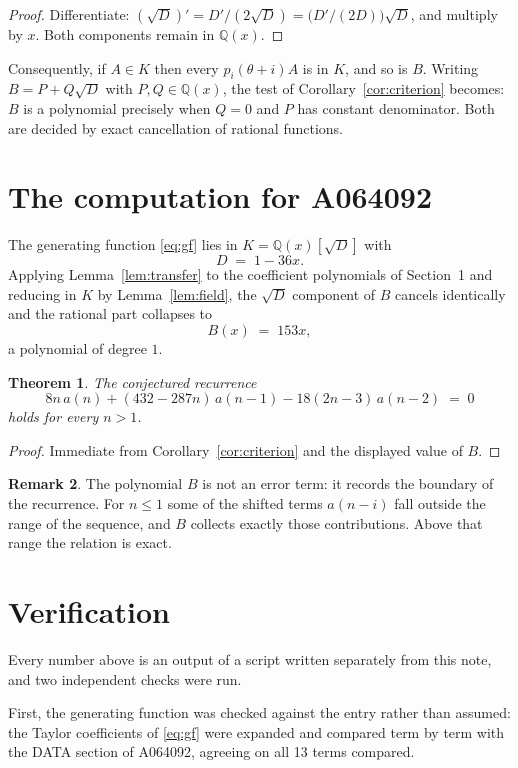 \documentclass[11pt,a4paper]{article}
\theoremstyle{plain}
\newtheorem{theorem}{Theorem}
\theoremstyle{definition}
\newtheorem{remark}[theorem]{Remark}
\begin{document}
\begin{proof}
Differentiate: $(\sqrt{D})'=D'/(2\sqrt{D})=\bigl(D'/(2D)\bigr)\sqrt{D}$, and multiply by
$x$. Both components remain in $\mathbb{Q}(x)$.
\end{proof}

Consequently, if $A\in K$ then every $p_{i}(\theta+i)A$ is in $K$, and so is $B$. Writing
$B=P+Q\sqrt{D}$ with $P,Q\in\mathbb{Q}(x)$, the test of Corollary~\ref{cor:criterion}
becomes: $B$ is a polynomial precisely when $Q=0$ and $P$ has constant denominator. Both
are decided by exact cancellation of rational functions.

\section{The computation for A064092}

The generating function \eqref{eq:gf} lies in $K=\mathbb{Q}(x)[\sqrt{D}]$ with
\[
D \;=\; 1 - 36 x .
\]
Applying Lemma~\ref{lem:transfer} to the coefficient polynomials of Section~1 and reducing
in $K$ by Lemma~\ref{lem:field}, the $\sqrt{D}$ component of $B$ cancels identically and
the rational part collapses to
\[
B(x)\;=\;153 x ,
\]
a polynomial of degree $1$.

\begin{theorem}
The conjectured recurrence
\[
8 n\,a(n) + (432 - 287 n)\,a(n-1) -  18 \left(2 n - 3\right)\,a(n-2) \;=\;0
\]
holds for every $n>1$.
\end{theorem}

\begin{proof}
Immediate from Corollary~\ref{cor:criterion} and the displayed value of $B$.
\end{proof}

\begin{remark}
The polynomial $B$ is not an error term: it records the boundary of the recurrence. For
$n\le1$ some of the shifted terms $a(n-i)$ fall outside the range of the sequence,
and $B$ collects exactly those contributions. Above that range the relation is exact.
\end{remark}

\section{Verification}

Every number above is an output of a script written separately from this note, and two
independent checks were run.

First, the generating function was checked against the entry rather than assumed: the
Taylor coefficients of \eqref{eq:gf} were expanded and compared term by term with the DATA
section of A064092, agreeing on all 13 terms compared.
\end{document}
